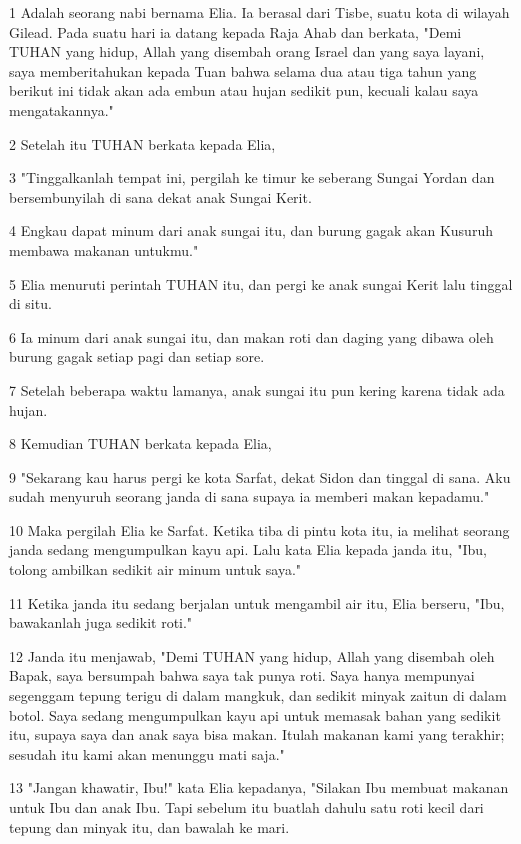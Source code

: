 \par 1 Adalah seorang nabi bernama Elia. Ia berasal dari Tisbe, suatu kota di wilayah Gilead. Pada suatu hari ia datang kepada Raja Ahab dan berkata, "Demi TUHAN yang hidup, Allah yang disembah orang Israel dan yang saya layani, saya memberitahukan kepada Tuan bahwa selama dua atau tiga tahun yang berikut ini tidak akan ada embun atau hujan sedikit pun, kecuali kalau saya mengatakannya."
\par 2 Setelah itu TUHAN berkata kepada Elia,
\par 3 "Tinggalkanlah tempat ini, pergilah ke timur ke seberang Sungai Yordan dan bersembunyilah di sana dekat anak Sungai Kerit.
\par 4 Engkau dapat minum dari anak sungai itu, dan burung gagak akan Kusuruh membawa makanan untukmu."
\par 5 Elia menuruti perintah TUHAN itu, dan pergi ke anak sungai Kerit lalu tinggal di situ.
\par 6 Ia minum dari anak sungai itu, dan makan roti dan daging yang dibawa oleh burung gagak setiap pagi dan setiap sore.
\par 7 Setelah beberapa waktu lamanya, anak sungai itu pun kering karena tidak ada hujan.
\par 8 Kemudian TUHAN berkata kepada Elia,
\par 9 "Sekarang kau harus pergi ke kota Sarfat, dekat Sidon dan tinggal di sana. Aku sudah menyuruh seorang janda di sana supaya ia memberi makan kepadamu."
\par 10 Maka pergilah Elia ke Sarfat. Ketika tiba di pintu kota itu, ia melihat seorang janda sedang mengumpulkan kayu api. Lalu kata Elia kepada janda itu, "Ibu, tolong ambilkan sedikit air minum untuk saya."
\par 11 Ketika janda itu sedang berjalan untuk mengambil air itu, Elia berseru, "Ibu, bawakanlah juga sedikit roti."
\par 12 Janda itu menjawab, "Demi TUHAN yang hidup, Allah yang disembah oleh Bapak, saya bersumpah bahwa saya tak punya roti. Saya hanya mempunyai segenggam tepung terigu di dalam mangkuk, dan sedikit minyak zaitun di dalam botol. Saya sedang mengumpulkan kayu api untuk memasak bahan yang sedikit itu, supaya saya dan anak saya bisa makan. Itulah makanan kami yang terakhir; sesudah itu kami akan menunggu mati saja."
\par 13 "Jangan khawatir, Ibu!" kata Elia kepadanya, "Silakan Ibu membuat makanan untuk Ibu dan anak Ibu. Tapi sebelum itu buatlah dahulu satu roti kecil dari tepung dan minyak itu, dan bawalah ke mari.

